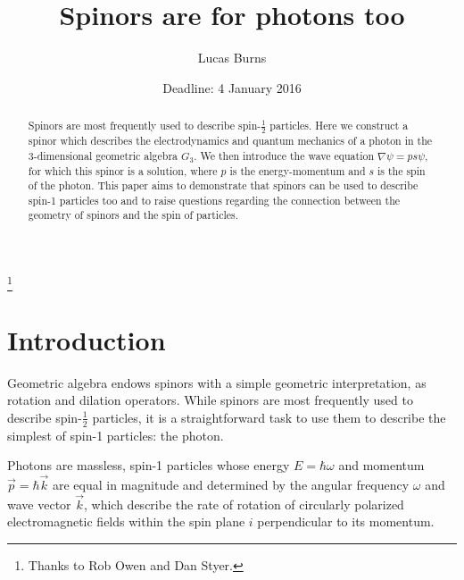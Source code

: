 \documentclass{birkjour}
\begin{document}
\title{Spinors are for photons too}

\author{Lucas Burns} 
\address{
135 W Lorain St\\
OCMR 488\\
Oberlin, OH 44074 \\
USA}

\thanks{Thanks to Rob Owen and Dan Styer.}



\date{Deadline: 4 January 2016}

\begin{abstract}
  Spinors are most frequently used to describe spin-$\frac{1}{2}$ particles. Here we construct a spinor which describes the electrodynamics and quantum mechanics of a photon in the 3-dimensional geometric algebra $G_3$. We then introduce the wave equation $\nabla \psi = p s \psi$, for which this spinor is a solution, where $p$ is the energy-momentum and $s$ is the spin of the photon. This paper aims to demonstrate that spinors can be used to describe spin-1 particles too and to raise questions regarding the connection between the geometry of spinors and the spin of particles.
\end{abstract}

\maketitle

\section{Introduction}

Geometric algebra endows spinors with a simple geometric interpretation, as rotation and dilation operators. While spinors are most frequently used to describe spin-$\frac{1}{2}$ particles, it is a straightforward task to use them to describe the simplest of spin-1 particles: the photon.

Photons are massless, spin-1 particles whose energy $E = \hbar \omega$ and momentum $\vec p = \hbar \vec k$ are equal in magnitude and determined by the angular frequency $\omega$ and wave vector $\vec k$, which describe the rate of rotation of circularly polarized electromagnetic fields within the spin plane $i$ perpendicular to its momentum.
\end{document}
